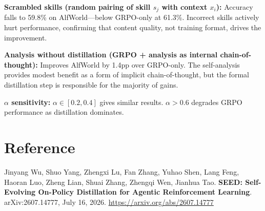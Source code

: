 \documentclass[10pt,twocolumn]{article}
\begin{document}
\textbf{Scrambled skills (random pairing of skill $s_j$ with context
$x_i$):} Accuracy falls to 59.8\% on AlfWorld---below GRPO-only at
61.3\%. Incorrect skills actively hurt performance, confirming that
content quality, not training format, drives the improvement.

\textbf{Analysis without distillation (GRPO + analysis as internal
chain-of-thought):} Improves AlfWorld by 1.4pp over GRPO-only. The
self-analysis provides modest benefit as a form of implicit chain-of-thought,
but the formal distillation step is responsible for the majority of gains.

\textbf{$\alpha$ sensitivity:} $\alpha \in [0.2, 0.4]$ gives similar
results. $\alpha > 0.6$ degrades GRPO performance as distillation
dominates.

\section*{Reference}

Jinyang Wu, Shuo Yang, Zhengxi Lu, Fan Zhang, Yuhao Shen, Lang Feng,
Haoran Luo, Zheng Lian, Shuai Zhang, Zhengqi Wen, Jianhua Tao.
\textbf{SEED: Self-Evolving On-Policy Distillation for Agentic Reinforcement Learning}.
arXiv:2607.14777, July 16, 2026.
\url{https://arxiv.org/abs/2607.14777}
\end{document}
